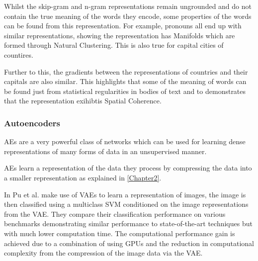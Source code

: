 Whilst the skip-gram and n-gram representations remain ungrounded and do not contain the true meaning of the words they encode, some properties of the words can be found from this representation. For example, pronouns all end up with similar representations, showing the representation has Manifolds which are formed through Natural Clustering. This is also true for capital cities of countires. 

Further to this, the gradients between the representations of countries and their capitals are also similar. This highlights that some of the meaning of words can be found just from statistical regularities in bodies of text and to demonstrates that the representation exihibtis Spatial Coherence.


\subsubsection{Autoencoders}
\acp{AE} are a very powerful class of networks which can be used for learning dense representations of many forms of data in an unsupervised manner.

\acp{AE} learn a representation of the data they process by compressing the data into a smaller representation as explained in \autoref{Chapter2}.

In \cite{pu2016variational} Pu et al. make use of \acp{VAE} to learn a representation of images, the image is then classified using a multiclass \ac{SVM} conditioned on the image representations from the \ac{VAE}. They compare their classification performance on various benchmarks demonstrating similar performance to state-of-the-art techniques but with much lower computation time. The computational performance gain is achieved due to a combination of using \acp{GPU} and the reduction in computational complexity from the compression of the image data via the \ac{VAE}.

